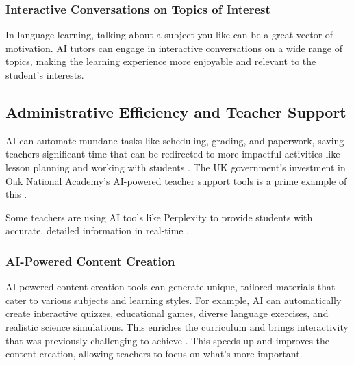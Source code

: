 \documentclass{article}
\begin{document}
\subsubsection{Interactive Conversations on Topics of Interest}

In language learning, talking about a subject you like can be a great vector of motivation. AI tutors can engage in interactive conversations on a wide range of topics, making the learning experience more enjoyable and relevant to the student's interests.

\subsection{Administrative Efficiency and Teacher Support}

AI can automate mundane tasks like scheduling, grading, and paperwork, saving teachers significant time that can be redirected to more impactful activities like lesson planning and working with students \cite{https://www.datasciencecentral.com/automated-grading-systems-how-ai-is-revolutionizing-exam-evaluation/} \cite{https://www.mckinsey.com/industries/education/our-insights/how-artificial-intelligence-will-impact-k-12-teachers}. The UK government's investment in Oak National Academy's AI-powered teacher support tools is a prime example of this \cite{https://www.gov.uk/government/news/new-support-for-teachers-powered-by-artificial-intelligence} \cite{https://www.openaccessgovernment.org/uk-government-invests-in-ai-powered-teacher-support/169271/}.

Some teachers are using AI tools like Perplexity to provide students with accurate, detailed information in real-time \cite{https://www.tri-cityherald.com/news/local/education/article280745295.html} \cite{https://www.notion.so/Should-schools-fear-cheating-with-AI-Tri-Cities-teacher-says-it-could-be-revolutionary-37bd19be245b44a1bcf427ade7fe42ec?pvs=21}.

\subsubsection{AI-Powered Content Creation}

AI-powered content creation tools can generate unique, tailored materials that cater to various subjects and learning styles. For example, AI can automatically create interactive quizzes, educational games, diverse language exercises, and realistic science simulations. This enriches the curriculum and brings interactivity that was previously challenging to achieve \cite{https://neurosys.com/blog/generative-ai-in-learning-and-education}. This speeds up and improves the content creation, allowing teachers to focus on what's more important.
\end{document}

